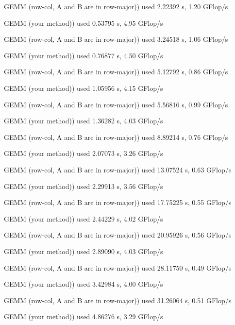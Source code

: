 \documentclass[12pt]{article}
\begin{document}
GEMM (row-col, A and B are in row-major)) used 2.22392 s, 1.20 GFlop/s

GEMM (your method)) used 0.53795 s, 4.95 GFlop/s

GEMM (row-col, A and B are in row-major)) used 3.24518 s, 1.06 GFlop/s

GEMM (your method)) used 0.76877 s, 4.50 GFlop/s

GEMM (row-col, A and B are in row-major)) used 5.12792 s, 0.86 GFlop/s

GEMM (your method)) used 1.05956 s, 4.15 GFlop/s

GEMM (row-col, A and B are in row-major)) used 5.56816 s, 0.99 GFlop/s

GEMM (your method)) used 1.36282 s, 4.03 GFlop/s

GEMM (row-col, A and B are in row-major)) used 8.89214 s, 0.76 GFlop/s

GEMM (your method)) used 2.07073 s, 3.26 GFlop/s

GEMM (row-col, A and B are in row-major)) used 13.07524 s, 0.63 GFlop/s

GEMM (your method)) used 2.29913 s, 3.56 GFlop/s

GEMM (row-col, A and B are in row-major)) used 17.75225 s, 0.55 GFlop/s

GEMM (your method)) used 2.44229 s, 4.02 GFlop/s

GEMM (row-col, A and B are in row-major)) used 20.95926 s, 0.56 GFlop/s

GEMM (your method)) used 2.89090 s, 4.03 GFlop/s

GEMM (row-col, A and B are in row-major)) used 28.11750 s, 0.49 GFlop/s

GEMM (your method)) used 3.42984 s, 4.00 GFlop/s

GEMM (row-col, A and B are in row-major)) used 31.26064 s, 0.51 GFlop/s

GEMM (your method)) used 4.86276 s, 3.29 GFlop/s
\end{document}
